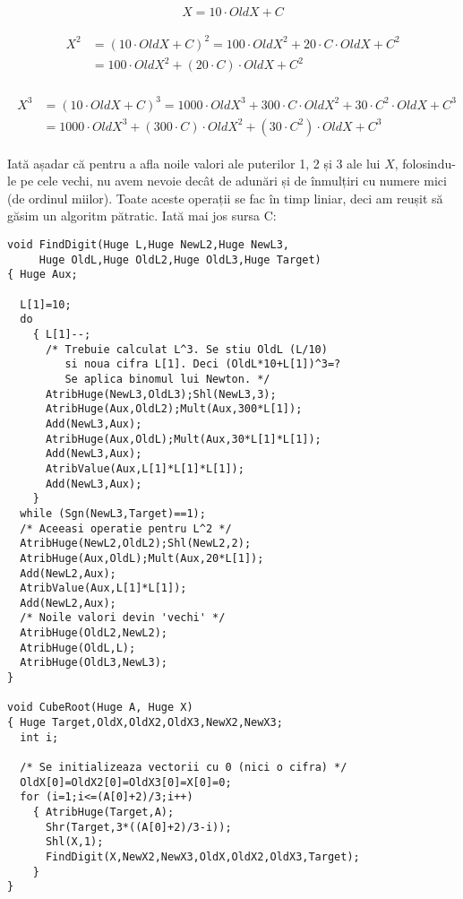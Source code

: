 \begin{equation}
  X = 10 \cdot OldX + C
\end{equation}

\begin{align}
  \begin{split}
    X^2 & = (10 \cdot OldX + C)^2 = 100 \cdot OldX^2 + 20 \cdot C \cdot OldX + C^2 \\
    & = 100 \cdot OldX^2 + (20 \cdot C) \cdot OldX + C^2
  \end{split}
\end{align}

\begin{align}
  \begin{split}
    X^3 & = (10 \cdot OldX + C)^3 = 1000 \cdot OldX^3 + 300 \cdot C \cdot OldX^2 + 30 \cdot C^2 \cdot OldX + C^3 \\
    & = 1000 \cdot OldX^3 + (300 \cdot C) \cdot OldX^2 + (30 \cdot C^2) \cdot OldX + C^3
  \end{split}
\end{align}

Iată așadar că pentru a afla noile valori ale puterilor 1, 2 și 3 ale lui $X$,
folosindu-le pe cele vechi, nu avem nevoie decât de adunări și de înmulțiri cu
numere mici (de ordinul miilor). Toate aceste operații se fac în timp liniar,
deci am reușit să găsim un algoritm pătratic. Iată mai jos sursa C:

\begin{verbatim}
void FindDigit(Huge L,Huge NewL2,Huge NewL3,
     Huge OldL,Huge OldL2,Huge OldL3,Huge Target)
{ Huge Aux;

  L[1]=10;
  do
    { L[1]--;
      /* Trebuie calculat L^3. Se stiu OldL (L/10)
         si noua cifra L[1]. Deci (OldL*10+L[1])^3=?
         Se aplica binomul lui Newton. */
      AtribHuge(NewL3,OldL3);Shl(NewL3,3);
      AtribHuge(Aux,OldL2);Mult(Aux,300*L[1]);
      Add(NewL3,Aux);
      AtribHuge(Aux,OldL);Mult(Aux,30*L[1]*L[1]);
      Add(NewL3,Aux);
      AtribValue(Aux,L[1]*L[1]*L[1]);
      Add(NewL3,Aux);
    }
  while (Sgn(NewL3,Target)==1);
  /* Aceeasi operatie pentru L^2 */
  AtribHuge(NewL2,OldL2);Shl(NewL2,2);
  AtribHuge(Aux,OldL);Mult(Aux,20*L[1]);
  Add(NewL2,Aux);
  AtribValue(Aux,L[1]*L[1]);
  Add(NewL2,Aux);
  /* Noile valori devin 'vechi' */
  AtribHuge(OldL2,NewL2);
  AtribHuge(OldL,L);
  AtribHuge(OldL3,NewL3);
}

void CubeRoot(Huge A, Huge X)
{ Huge Target,OldX,OldX2,OldX3,NewX2,NewX3;
  int i;

  /* Se initializeaza vectorii cu 0 (nici o cifra) */
  OldX[0]=OldX2[0]=OldX3[0]=X[0]=0;
  for (i=1;i<=(A[0]+2)/3;i++)
    { AtribHuge(Target,A);
      Shr(Target,3*((A[0]+2)/3-i));
      Shl(X,1);
      FindDigit(X,NewX2,NewX3,OldX,OldX2,OldX3,Target);
    }
}
\end{verbatim}

